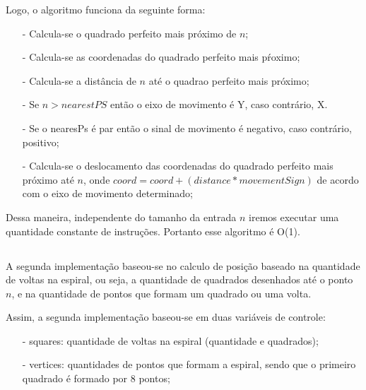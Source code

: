 \documentclass[12pt,a4paper]{article}
\begin{document}
        Logo, o algoritmo funciona da seguinte forma:
        \begin{itemize}
        	\item[-] Calcula-se o quadrado perfeito mais próximo de $n$;
        	\item[-] Calcula-se as coordenadas do quadrado perfeito mais pŕoximo;
        	\item[-] Calcula-se a distância de $n$ até o quadrao perfeito mais próximo;
        	\item[-] Se  $n > nearestPS$ então o eixo de movimento é Y, caso contrário, X.
        	\item[-] Se o nearesPs é par então o sinal de movimento é negativo, caso contrário, positivo;
        	\item[-] Calcula-se o deslocamento das coordenadas do quadrado perfeito mais próximo até $n$, onde $coord = coord + (distance * movementSign)$ de acordo com o eixo de movimento determinado;
    	\end{itemize}
        Dessa maneira, independente do tamanho da entrada $n$ iremos executar uma quantidade constante de instruções. Portanto esse algoritmo é O(1).
        
    \subsection{}
        A segunda implementação baseou-se no calculo de posição baseado na quantidade de voltas na espiral, ou seja, a quantidade de quadrados desenhados até o ponto $n$, e na quantidade de pontos que formam um quadrado ou uma volta.
        
        Assim, a segunda implementação baseou-se em duas variáveis de controle:
        \begin{itemize}
        	\item[-] squares: quantidade de voltas na espiral (quantidade e quadrados);
        	\item[-] vertices: quantidades de pontos que formam a espiral, sendo que o primeiro quadrado é formado por 8 pontos;
    	\end{itemize}
    	
\end{document}
